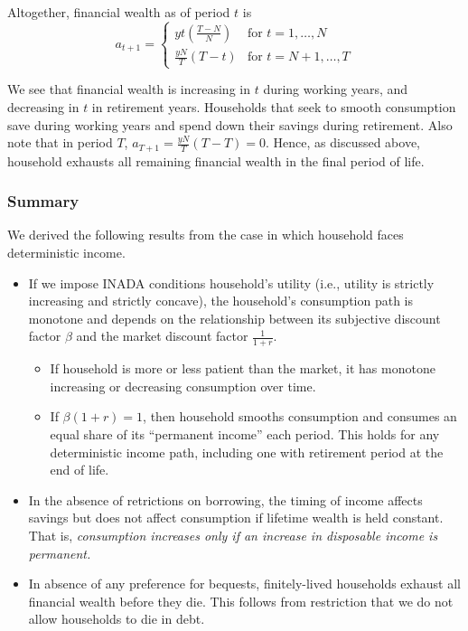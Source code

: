 \documentclass[11pt]{article}
\begin{document}
Altogether, financial wealth as of period $t$ is $$a_{t+1} = \begin{cases}
    yt\left(\frac{T-N}{N}\right) & \text{for $t=1,\dots,N$} \\
    \frac{yN}{T}(T-t) & \text{for $t=N+1,\dots,T$}
\end{cases}$$

We see that financial wealth is increasing in $t$ during working years, and decreasing in $t$ in retirement years. Households that seek to smooth consumption save during working years and spend down their savings during retirement. Also note that in period $T$, $a_{T+1} = \frac{yN}{T}(T-T) = 0$. Hence, as discussed above, household exhausts all remaining financial wealth in the final period of life.

\subsubsection{Summary}
We derived the following results from the case in which household faces deterministic income.
\begin{itemize}
    \item If we impose INADA conditions household's utility (i.e., utility is strictly increasing and strictly concave), the household's consumption path is monotone and depends on the relationship between its subjective discount factor $\beta$ and the market discount factor $\frac{1}{1+r}$. 
    \begin{itemize}
        \item If household is more or less patient than the market, it has monotone increasing or decreasing consumption over time.
        \item If $\beta(1+r) = 1$, then household smooths consumption and consumes an equal share of its ``permanent income'' each period. This holds for any deterministic income path, including one with retirement period at the end of life.
    \end{itemize}
    \item In the absence of retrictions on borrowing, the timing of income affects savings but does not affect consumption if lifetime wealth is held constant. That is, \emph{consumption increases only if an increase in disposable income is permanent.}
    \item In absence of any preference for bequests, finitely-lived households exhaust all financial wealth before they die. This follows from restriction that we do not allow households to die in debt.
\end{itemize}
\end{document}
